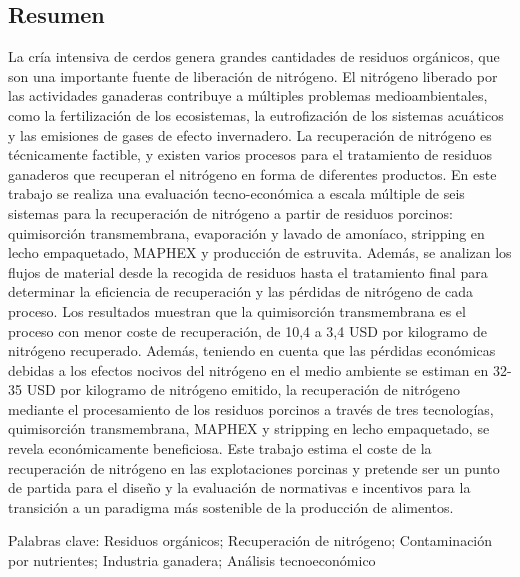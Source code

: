 \begin{refsection}[referencesCh6]
\section*{Resumen}
La cría intensiva de cerdos genera grandes cantidades de residuos orgánicos, que son una importante fuente de liberación de nitrógeno. El nitrógeno liberado por las actividades ganaderas contribuye a múltiples problemas medioambientales, como la fertilización de los ecosistemas, la eutrofización de los sistemas acuáticos y las emisiones de gases de efecto invernadero. La recuperación de nitrógeno es técnicamente factible, y existen varios procesos para el tratamiento de residuos ganaderos que recuperan el nitrógeno en forma de diferentes productos. En este trabajo se realiza una evaluación tecno-económica a escala múltiple de seis sistemas para la recuperación de nitrógeno a partir de residuos porcinos: quimisorción transmembrana, evaporación y lavado de amoníaco, stripping en lecho empaquetado, MAPHEX y producción de estruvita. Además, se analizan los flujos de material desde la recogida de residuos hasta el tratamiento final para determinar la eficiencia de recuperación y las pérdidas de nitrógeno de cada proceso. Los resultados muestran que la quimisorción transmembrana es el proceso con menor coste de recuperación, de 10,4 a 3,4 USD por kilogramo de nitrógeno recuperado. Además, teniendo en cuenta que las pérdidas económicas debidas a los efectos nocivos del nitrógeno en el medio ambiente se estiman en 32-35 USD por kilogramo de nitrógeno emitido, la recuperación de nitrógeno mediante el procesamiento de los residuos porcinos a través de tres tecnologías, quimisorción transmembrana, MAPHEX y stripping en lecho empaquetado, se revela económicamente beneficiosa. Este trabajo estima el coste de la recuperación de nitrógeno en las explotaciones porcinas y pretende ser un punto de partida para el diseño y la evaluación de normativas e incentivos para la transición a un paradigma más sostenible de la producción de alimentos.

\bigskip
Palabras clave: Residuos orgánicos; Recuperación de nitrógeno; Contaminación por nutrientes; Industria ganadera; Análisis tecnoeconómico
\newpage


\end{refsection}
